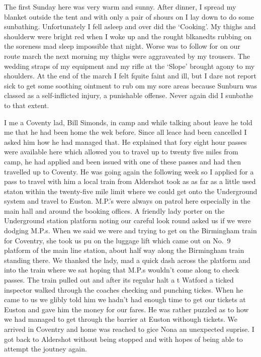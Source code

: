The first Sunday here was very warm and sunny. After dinner, I spread
my blanket outside the tent and with only a pair of shours on I lay
down to do some sunbathing. Unfortunately I fell asleep and over did
the `Cooking'. My thighs and shoulderw were bright red when I woke up
and the rought blkanedts rubbing on the soreness mad sleep impossible
that night. Worse was to follow for on our route march the next
morning my thighs were aggraveated by my trousers. The wedding straps
of my equipment and my rifle at the `Slope' brought agony to my
shoulders. At the end of the march I felt fquite faint and ill, but I
dare not report sick to get some soothing ointment to rub om my sore
areas because Sunburn was classed as a self-inflicted injury, a
punishable offense. Never again did I sunbathe to that extent.

I me a Coventy lad, Bill Simonds, in camp and while talking about
leave he told me that he had been home the wek before. Since all leace
had been cancelled I asked him how he had managed that. He explained
that fory eight hour passes were available here which allowed you to
travel up to twenty five miles from camp, he had applied and been
issued with one of these passes and had then travelled up to
Coventy. He was going again the following week so I applied for a pass
to travel with him a local train from Aldershot took as as far as a
little used staton within the twenty-five mile limit where we could
get onto the Underground system and travel to Euston. M.P.'s were
always on patrol here especially in the main hall and around the
booking offices. A friendly lady porter on the Underground station
platform noting our careful look round asked us if we were dodging
M.P.s. When we said we were and trying to get on the Birmingham train
for Coventry, she took us pu on the luggage lift which came out on
No.~9 platform of the main line station, about half way along the
Birmingham train standing there. We thanked the lady, mad a quick dash
across the platform and into the train where we sat hoping that M.P.s
wouldn't come along to check passes. The train pulled out and after
its regular halt a t Watford a ticked inspector walked through the
coaches checking and punching tickes. When he came to us we glibly
told him we hadn't had enough time to get our tickets at Euston and
gave him the money for our fares. He was rather puzzled as to how we
had managed to get through the barrier at Euston withough tickets. We
arrived in Coventry and home was reached to gice Nona an unexpected
suprise. I got back to Aldershot without being stopped and with hopes
of being able to attempt the joutney again.

